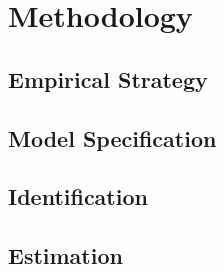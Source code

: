 \section{Methodology}

\subsection{Empirical Strategy}

\subsection{Model Specification}

\subsection{Identification}

\subsection{Estimation}
